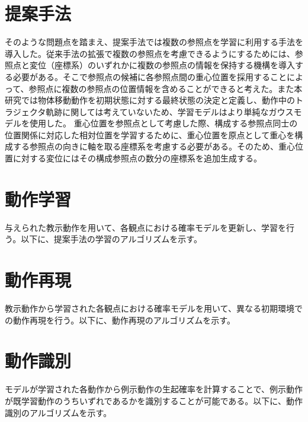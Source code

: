 \section{提案手法}

そのような問題点を踏まえ、提案手法では複数の参照点を学習に利用する手法を導入した。従来手法の拡張で複数の参照点を考慮できるようにするためには、参照点と変位（座標系）のいずれかに複数の参照点の情報を保持する機構を導入する必要がある。そこで参照点の候補に各参照点間の重心位置を採用することによって、参照点に複数の参照点の位置情報を含めることができると考えた。また本研究では物体移動動作を初期状態に対する最終状態の決定と定義し、動作中のトラジェクタ軌跡に関しては考えていないため、学習モデルはより単純なガウスモデルを使用した。
重心位置を参照点として考慮した際、構成する参照点同士の位置関係に対応した相対位置を学習するために、重心位置を原点として重心を構成する参照点の向きに軸を取る座標系を考慮する必要がある。そのため、重心位置に対する変位にはその構成参照点の数分の座標系を追加生成する。

\section{動作学習}

与えられた教示動作を用いて、各観点における確率モデルを更新し、学習を行う。以下に、提案手法の学習のアルゴリズムを示す。



\section{動作再現}

教示動作から学習された各観点における確率モデルを用いて、異なる初期環境での動作再現を行う。以下に、動作再現のアルゴリズムを示す。

\section{動作識別}

モデルが学習された各動作から例示動作の生起確率を計算することで、例示動作が既学習動作のうちいずれであるかを識別することが可能である。以下に、動作識別のアルゴリズムを示す。
